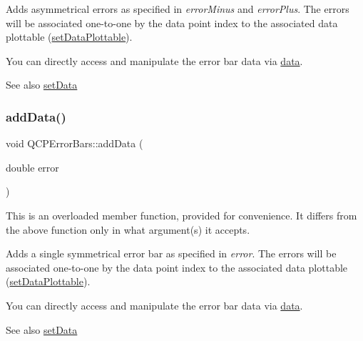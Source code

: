 Adds asymmetrical errors as specified in {\itshape error\+Minus} and {\itshape error\+Plus}. The errors will be associated one-\/to-\/one by the data point index to the associated data plottable (\mbox{\hyperlink{class_q_c_p_error_bars_aabb42a964cfbf780cd1c79850c7cd989}{set\+Data\+Plottable}}).

You can directly access and manipulate the error bar data via \mbox{\hyperlink{class_q_c_p_error_bars_aeebd1b14f4c3573565efafd514988813}{data}}.

\begin{DoxySeeAlso}{See also}
\mbox{\hyperlink{class_q_c_p_error_bars_a92b1980003255f5f7c05407a4d92aabc}{set\+Data}} 
\end{DoxySeeAlso}
\mbox{\label{class_q_c_p_error_bars_a39ef73b0e61941fc4064fd3a5224c72a}} 
\subsubsection{\texorpdfstring{addData()}{addData()}\hspace{0.1cm}{\footnotesize\ttfamily [3/4]}}
{\footnotesize\ttfamily void Q\+C\+P\+Error\+Bars\+::add\+Data (\begin{DoxyParamCaption}\item[{double}]{error }\end{DoxyParamCaption})}

This is an overloaded member function, provided for convenience. It differs from the above function only in what argument(s) it accepts.

Adds a single symmetrical error bar as specified in {\itshape error}. The errors will be associated one-\/to-\/one by the data point index to the associated data plottable (\mbox{\hyperlink{class_q_c_p_error_bars_aabb42a964cfbf780cd1c79850c7cd989}{set\+Data\+Plottable}}).

You can directly access and manipulate the error bar data via \mbox{\hyperlink{class_q_c_p_error_bars_aeebd1b14f4c3573565efafd514988813}{data}}.

\begin{DoxySeeAlso}{See also}
\mbox{\hyperlink{class_q_c_p_error_bars_a92b1980003255f5f7c05407a4d92aabc}{set\+Data}} 
\end{DoxySeeAlso}
\mbox{\label{class_q_c_p_error_bars_a1833c5de9c2fe2952b977505d9f27cd1}} 
